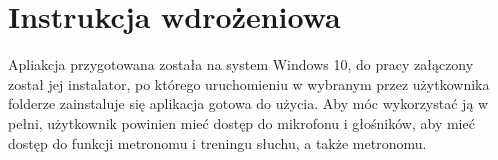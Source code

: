 \chapter{Instrukcja wdrożeniowa}
Apliakcja przygotowana została na system Windows 10, do pracy załączony został jej instalator, po którego uruchomieniu w wybranym przez użytkownika folderze zainstaluje się aplikacja gotowa do użycia. Aby móc wykorzystać ją w pełni, użytkownik powinien mieć dostęp do mikrofonu i głośników, aby mieć dostęp do funkcji metronomu i treningu słuchu, a także metronomu.
